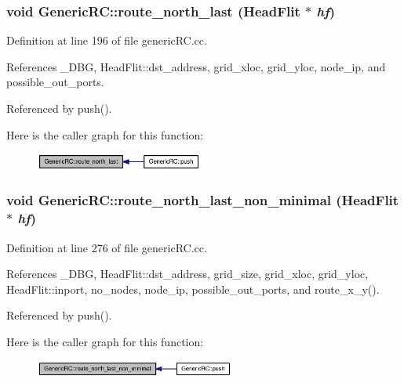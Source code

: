 \subsubsection[{route\_\-north\_\-last}]{\setlength{\rightskip}{0pt plus 5cm}void GenericRC::route\_\-north\_\-last ({\bf HeadFlit} $\ast$ {\em hf})\hspace{0.3cm}{\tt  [private]}}\label{classGenericRC_eb0b5aafb2ca2c35e9e8949394c0f6c6}




Definition at line 196 of file genericRC.cc.

References \_\-DBG, HeadFlit::dst\_\-address, grid\_\-xloc, grid\_\-yloc, node\_\-ip, and possible\_\-out\_\-ports.

Referenced by push().

Here is the caller graph for this function:\nopagebreak
\begin{figure}[H]
\begin{center}
\leavevmode
\includegraphics[width=155pt]{classGenericRC_eb0b5aafb2ca2c35e9e8949394c0f6c6_icgraph}
\end{center}
\end{figure}
\subsubsection[{route\_\-north\_\-last\_\-non\_\-minimal}]{\setlength{\rightskip}{0pt plus 5cm}void GenericRC::route\_\-north\_\-last\_\-non\_\-minimal ({\bf HeadFlit} $\ast$ {\em hf})\hspace{0.3cm}{\tt  [private]}}\label{classGenericRC_10cdb1416ae7da4cc9430d9cfb3329b5}




Definition at line 276 of file genericRC.cc.

References \_\-DBG, HeadFlit::dst\_\-address, grid\_\-size, grid\_\-xloc, grid\_\-yloc, HeadFlit::inport, no\_\-nodes, node\_\-ip, possible\_\-out\_\-ports, and route\_\-x\_\-y().

Referenced by push().

Here is the caller graph for this function:\nopagebreak
\begin{figure}[H]
\begin{center}
\leavevmode
\includegraphics[width=185pt]{classGenericRC_10cdb1416ae7da4cc9430d9cfb3329b5_icgraph}
\end{center}
\end{figure}
